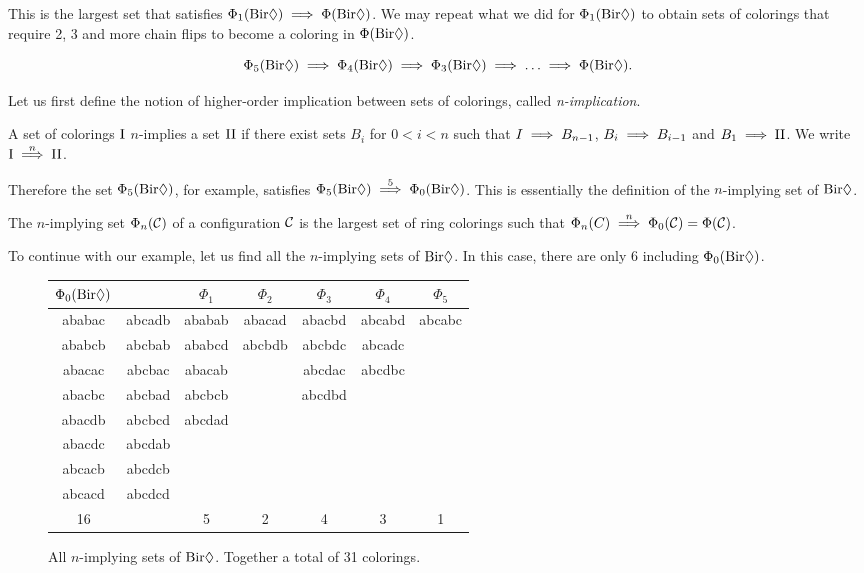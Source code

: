 This is the largest set that satisfies $\Phi_1(\text{Bir}\Diamond) \implies \Phi(\text{Bir}\Diamond)$. We may repeat what we did for $\Phi_1(\text{Bir}\Diamond)$ to obtain sets of colorings that require 2, 3 and more chain flips to become a coloring in $\Phi(\text{Bir}\Diamond)$.

\begin{equation}
    \Phi_5(\text{Bir}\Diamond) \implies \Phi_4(\text{Bir}\Diamond) \implies \Phi_3(\text{Bir}\Diamond) \implies \ldots \implies \Phi(\text{Bir}\Diamond).
\end{equation}

Let us first define the notion of higher-order implication between sets of colorings, called \textit{n-implication}.

\begin{definition}
    A set of colorings $\text{I}$ $n$-implies a set $\text{II}$ if there exist sets $B_i$ for $0 < i < n$ such that $I \implies B_{n-1}$, $B_i \implies B_{i-1}$ and $B_1 \implies \text{II}$. We write $\text{I} \stackrel{n}{\implies} \text{II}$.
\end{definition}

Therefore the set $\Phi_5(\text{Bir}\Diamond)$, for example, satisfies $\Phi_5(\text{Bir}\Diamond) \stackrel{5}{\implies} \Phi_0(\text{Bir}\Diamond)$. This is essentially the definition of the $n$-implying set of $\text{Bir}\Diamond$.

\begin{definition}
    The $n$-implying set $\Phi_n(\mathcal{C})$ of a configuration $\mathcal{C}$ is the largest set of ring colorings such that $\Phi_n(C) \stackrel{n}{\implies} \Phi_0(\mathcal{C}) = \Phi(\mathcal{C})$. 
\end{definition}

To continue with our example, let us find all the $n$-implying sets of $\text{Bir}\Diamond$. In this case, there are only 6 including $\Phi_0(\text{Bir}\Diamond)$.

\needspace{2cm}
\begin{figure}[!ht]
    \centering
    \begin{tabular}{ ccccccc }
        $\Phi_0(\text{Bir}\Diamond) $ & & $\Phi_1$ & $\Phi_2$ & $\Phi_3$ & $\Phi_4$ & $\Phi_5$ \\
        \hline
        ababac & abcadb & ababab & abacad & abacbd & abcabd & abcabc \\
        ababcb & abcbab & ababcd & abcbdb & abcbdc & abcadc & \\
        abacac & abcbac & abacab &        & abcdac & abcdbc & \\
        abacbc & abcbad & abcbcb &        & abcdbd &        & \\
        abacdb & abcbcd & abcdad &        &        &        & \\
        abacdc & abcdab \\
        abcacb & abcdcb \\
        abcacd & abcdcd \\
        \hline
        16 & & 5 & 2 & 4 & 3 & 1 \\
    \end{tabular}
    \caption{ All $n$-implying sets of $\text{Bir}\Diamond$. Together a total of 31 colorings. }
    \label{table:diamondmap}
\end{figure}

